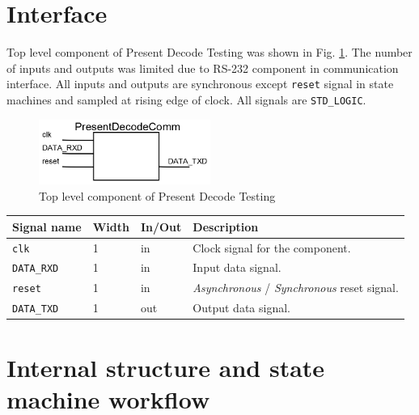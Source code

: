 \documentclass{gajewski}
\begin{document}
\newpage 

\section{Interface}

Top level component of Present Decode Testing was shown in Fig. \ref{pdectest}. The number of inputs and outputs was limited due to RS-232 component in communication interface. All inputs and outputs are synchronous except \texttt{reset} signal in state machines and sampled at rising edge of clock. All signals are \texttt{STD\_LOGIC}.
\begin{figure}[!ht]%
    \begin{center}
    \includegraphics[width=0.5\textwidth]{img/PresentDecodeTesting.png}
    \caption{%
        Top level component of Present Decode Testing 
     }%
    \label{pdectest}
    \end{center}
 \end{figure}

\begin{tabularx}{\textwidth}{|p{30mm}|p{11mm}|p{11mm}|X|}
  \hline \bf{Signal name} & \bf{Width} & \bf{In/Out} & \bf{Description}\\ 
  \hline \texttt{clk} & 1  &  in  & Clock signal for the component. \\ 
  \hline \texttt{DATA\_RXD} & 1 & in & Input data signal. \\
  \hline \texttt{reset}	& 1  &  in  &  \emph{Asynchronous} / \emph{Synchronous} reset signal.\\ 
  \hline \texttt{DATA\_TXD} & 1 &  out  & Output data signal.	\\ 
  \hline
\end{tabularx}

\newpage

\section{Internal structure and state machine workflow}
\end{document}
